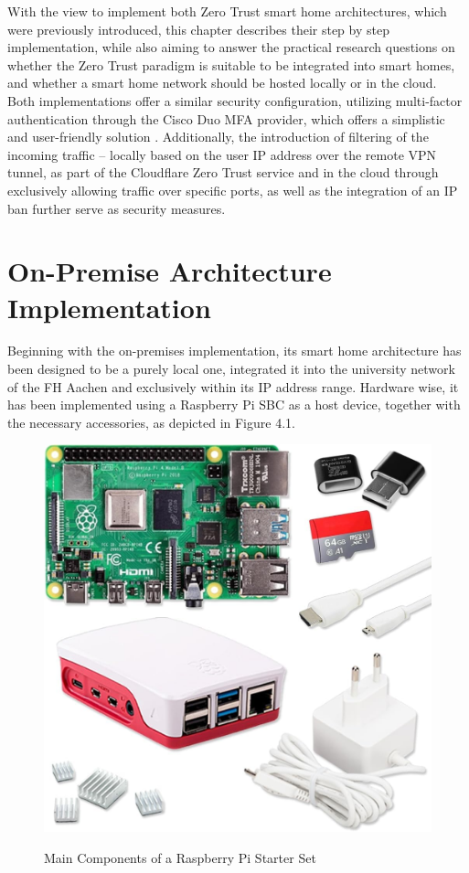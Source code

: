 With the view to implement both Zero Trust smart home architectures, which were previously introduced, this chapter describes their step by step implementation, while also aiming to answer the practical research questions on whether the Zero Trust paradigm is suitable to be integrated into smart homes, and whether a smart home network should be hosted locally or in the cloud.\\
Both implementations offer a similar security configuration, utilizing multi-factor authentication through the Cisco Duo MFA provider, which offers a simplistic and user-friendly solution \cite{duo_mfa}. Additionally, the introduction of filtering of the incoming traffic -- locally based on the user IP address over the remote VPN tunnel, as part of the Cloudflare Zero Trust service \cite{cloudflare_zt} and in the cloud through exclusively allowing traffic over specific ports, as well as the integration of an IP ban further serve as security measures.

\section{On-Premise Architecture Implementation}
Beginning with the on-premises implementation, its smart home architecture has been designed to be a purely local one, integrated it into the university network of the FH Aachen and exclusively within its IP address range. Hardware wise, it has been implemented using a Raspberry Pi SBC as a host device, together with the necessary accessories, as depicted in Figure 4.1.
\begin{figure}[H]
	\centering
	\includegraphics[width=0.4 \linewidth]{Images/K4/hardware-rpi.jpg}
	\caption{Main Components of a Raspberry Pi Starter Set}
	\label{fig:Rpi_set}
    \cite{rpi_starter}
\end{figure}

